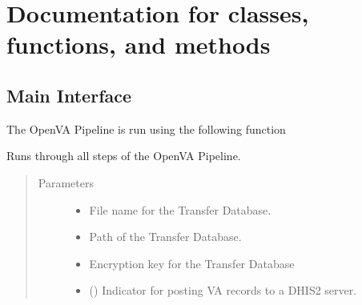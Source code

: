 \documentclass[letterpaper,12pt,english]{sphinxmanual}
\begin{document}
\chapter{Documentation for classes, functions, and methods}
\label{\detokenize{help:module-runPipeline}}\label{\detokenize{help:documentation-for-classes-functions-and-methods}}\label{\detokenize{help::doc}}\label{\detokenize{help:module-pipeline}}\label{\detokenize{help:module-transferDB}}\label{\detokenize{help:module-odk}}\label{\detokenize{help:module-openVA}}\label{\detokenize{help:module-dhis}}

\section{Main Interface}
\label{\detokenize{help:main-interface}}
The OpenVA Pipeline is run using the following function

\begin{fulllineitems}
\label{\detokenize{help:runPipeline.runPipeline}}
Runs through all steps of the OpenVA Pipeline.
\begin{quote}\begin{description}
\item[{Parameters}] \leavevmode\begin{itemize}
\item {} 
 \textendash{} File name for the Transfer Database.

\item {} 
 \textendash{} Path of the Transfer Database.

\item {} 
 \textendash{} Encryption key for the Transfer Database

\item {} 
 (\sphinxstyleliteralemphasis{\sphinxupquote{(}}\sphinxstyleliteralemphasis{\sphinxupquote{)}}) \textendash{} Indicator for posting VA records to a DHIS2 server.

\end{itemize}

\end{description}\end{quote}

\end{fulllineitems}
\end{document}
